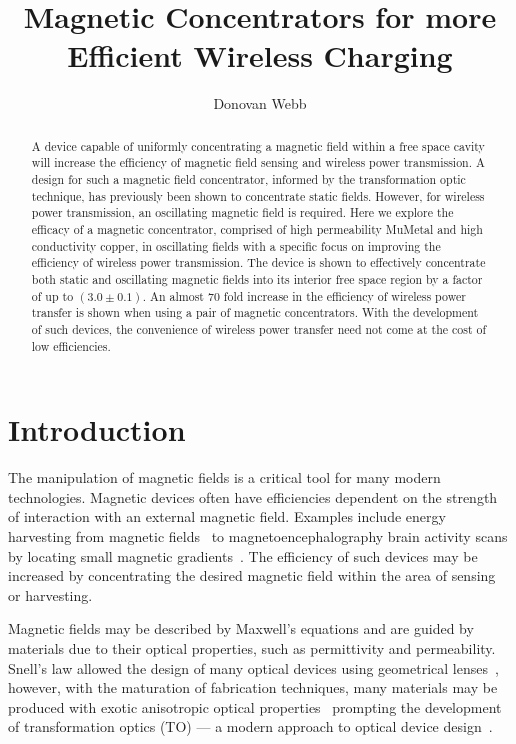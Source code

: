 \documentclass[11pt]{iopart}
\begin{document}
\title[]{Magnetic Concentrators for more Efficient Wireless Charging}

\author{Donovan Webb}

\address{Department of Physics,
University of Bath, Bath BA2 7AY, United Kingdom}

\begin{abstract}
A device capable of uniformly concentrating a magnetic field within a
free space cavity will increase the efficiency of magnetic field
sensing and wireless power transmission.
A design for such a magnetic field concentrator, informed by the
transformation optic technique, has previously been shown to
concentrate static fields.
However, for wireless power transmission, an oscillating magnetic
field is required.
Here we explore the efficacy of a magnetic concentrator, comprised of
high permeability MuMetal and high conductivity copper, in oscillating fields with a specific focus on
improving the efficiency of wireless power transmission.
The device is shown to effectively concentrate both static and
oscillating magnetic fields into its interior free space region by a
factor of up to $(3.0\pm0.1)$. An almost $70$ fold increase in the
efficiency of wireless power transfer is shown when using a pair of magnetic
concentrators.
With the development of such devices, the convenience of wireless
power transfer need not come at the cost of low efficiencies.

\end{abstract}
\section{Introduction}
The manipulation of magnetic fields is a critical tool for many modern
technologies. Magnetic devices often have efficiencies dependent on
the strength of interaction with an external magnetic field. Examples
include energy harvesting from magnetic fields~\cite{Hirai2000} to
magnetoencephalography brain activity scans by locating small magnetic
gradients~\cite{Cohen1968}. The efficiency of such devices may be increased by
concentrating the desired magnetic field within the area of sensing or
harvesting. 

Magnetic fields may be described by Maxwell's
equations and are guided by materials due to their
optical properties, such as permittivity and permeability. Snell's law
allowed the design of many optical devices
using geometrical lenses~\cite{Pendry2012}, however, with the maturation
of fabrication techniques, many materials may be produced with exotic
anisotropic optical properties~\cite{Smith2004} prompting the development
of transformation optics (TO) --- a modern approach to optical device
design~\cite{Pendry2006}.
\end{document}
